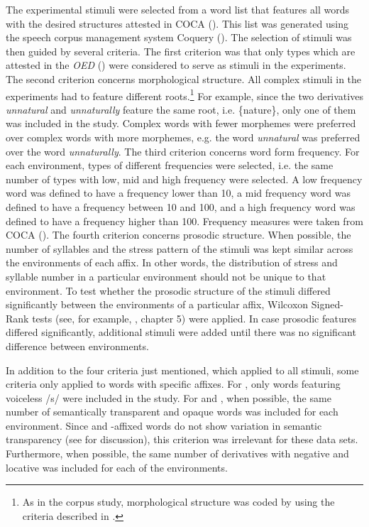 The experimental stimuli were selected from a word list that features all words with the desired structures attested in COCA (\citealt{Davies.20082014}). This list was generated using the speech corpus management system Coquery (\citealt{Kunter.2016}). The selection of stimuli was then guided by several criteria. 
The first criterion was that only types which are attested in the \textit{OED} (\citealt{OED.2013}) were considered to serve as stimuli in the experiments. 
The second criterion concerns morphological structure. All complex stimuli in the experiments had to feature different roots.\footnote{As in the corpus study, morphological structure was coded by using the criteria described in .} For example, since the two derivatives \textit{unnatural} and \textit{unnaturally} feature the same root, i.e. \{nature\}, only one of them was included in the study. Complex words with fewer morphemes were preferred over complex words with more morphemes, e.g. the word \textit{unnatural} was preferred over the word \textit{unnaturally}. 
 The third criterion concerns word form frequency. For each environment, types of different frequencies were selected, i.e. the same number of types with low, mid and high frequency were selected. A low frequency word was defined to have a frequency lower than 10, a mid frequency word was defined to have a frequency between 10 and 100, and a high frequency word was defined to have a frequency higher than 100. Frequency measures were taken from COCA (\citealt{Davies.20082014}).
  The fourth criterion concerns prosodic structure. When possible, the number of syllables and the stress pattern of the stimuli was kept similar across the environments of each affix. In other words, the distribution of stress and syllable number in a particular environment should not be unique to that environment. To test whether the prosodic structure of the stimuli differed significantly between the environments of a particular affix, Wilcoxon Signed-Rank tests (see, for example, \citealt{Crawley.2012}, chapter 5) were applied. In case prosodic features differed significantly, additional stimuli were added until there was no significant difference between environments.
 
 In addition to the four criteria just mentioned, which applied to all stimuli, some criteria only applied to words with specific affixes. 
 For , only words featuring voiceless /s/ were included in the study. 
 For  and , when possible, the same number of semantically transparent and opaque words was included for each environment. Since  and -affixed words do not show variation in semantic transparency (see  for discussion), this criterion was irrelevant for these data sets.
 Furthermore, when possible, the same number of derivatives with negative and locative  was included for each of the environments. 
 
